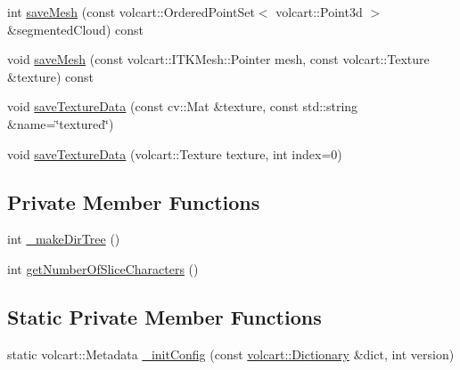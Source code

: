 \begin{DoxyCompactItemize}
\item 
int \hyperlink{classVolumePkg_a8b8474853f26ef0c08cd37ded220c344}{save\+Mesh} (const volcart\+::\+Ordered\+Point\+Set$<$ volcart\+::\+Point3d $>$ \&segmented\+Cloud) const
\item 
void \hyperlink{classVolumePkg_acd9f9d44b478d8d828de4f364983a5f0}{save\+Mesh} (const volcart\+::\+I\+T\+K\+Mesh\+::\+Pointer mesh, const volcart\+::\+Texture \&texture) const
\item 
void \hyperlink{classVolumePkg_ad13a7fb165caa0d3537942907a3e3cad}{save\+Texture\+Data} (const cv\+::\+Mat \&texture, const std\+::string \&name=\char`\"{}textured\char`\"{})
\item 
void \hyperlink{classVolumePkg_a47e37208ab713dbc8d72b5e7f71636f4}{save\+Texture\+Data} (volcart\+::\+Texture texture, int index=0)
\end{DoxyCompactItemize}
\subsection*{Private Member Functions}
\begin{DoxyCompactItemize}
\item 
int \hyperlink{classVolumePkg_ac141a45c12eb8e53def13282b2594ebe}{\+\_\+make\+Dir\+Tree} ()
\item 
int \hyperlink{classVolumePkg_a0c42b917841dd44d5c9de641fadd2a94}{get\+Number\+Of\+Slice\+Characters} ()
\end{DoxyCompactItemize}
\subsection*{Static Private Member Functions}
\begin{DoxyCompactItemize}
\item 
static volcart\+::\+Metadata \hyperlink{classVolumePkg_ab1829cf70b3b0a6031a85019ad8ecae7}{\+\_\+init\+Config} (const \hyperlink{namespacevolcart_aa4e334ff80b678b9556aee59618eb37a}{volcart\+::\+Dictionary} \&dict, int version)
\end{DoxyCompactItemize}
